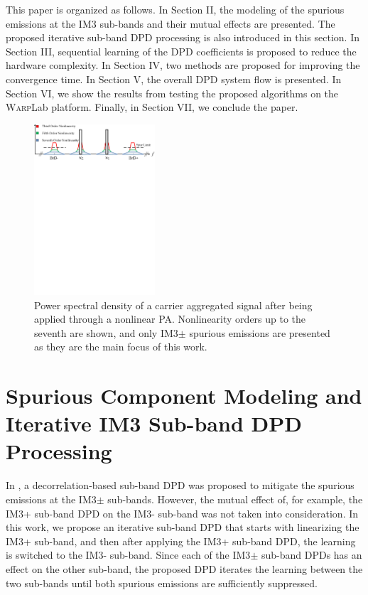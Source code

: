 \documentclass[9pt,conference]{IEEEtran}
\begin{document}
\begin{spacing}{0.88}
This paper is organized as follows. In Section II, the modeling of the spurious emissions at the IM3 sub-bands and their mutual effects are presented. The proposed iterative sub-band DPD processing is also introduced in this section. In Section III, sequential learning of the DPD coefficients is proposed to reduce the hardware complexity. In Section IV, two methods are proposed for improving the convergence time. In Section V, the overall DPD system flow is presented. In Section VI, we show the results from testing the proposed algorithms on the \textsc{Warp}Lab platform. Finally, in Section VII, we conclude the paper.

\begin{figure}
\centering
\centerline{\includegraphics[width=0.4\textwidth]{./Figures/PSD.pdf}}
\caption[]{Power spectral density of a carrier aggregated signal after being applied through a nonlinear PA. Nonlinearity orders up to the seventh are shown, and only IM3$\pm$ spurious emissions are presented as they are the main focus of this work.}
\label{fig:PSD}
\end{figure}

\section{Spurious Component Modeling and Iterative IM3 Sub-band DPD Processing}
\label{sec:Analysis}
In \cite{ICASSP2014}, a decorrelation-based sub-band DPD was proposed to mitigate the spurious emissions at the IM3$\pm$ sub-bands. However, the mutual effect of, for example, the IM3+ sub-band DPD on the IM3- sub-band was not taken into consideration. In this work, we propose an iterative sub-band DPD that starts with linearizing the IM3+ sub-band, and then after applying the IM3+ sub-band DPD, the learning is switched to the IM3- sub-band. Since each of the IM3$\pm$ sub-band DPDs has an effect on the other sub-band, the proposed DPD iterates the learning between the two sub-bands until both spurious emissions are sufficiently suppressed.


\end{spacing}
\end{document}
